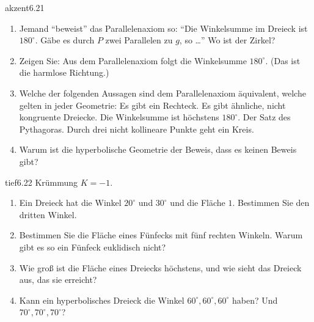 \begin{karte}{akzent}{6.21}{\typstolper}{}
\begin{enumerate}[label=(\alph*),leftmargin=1.6em,itemsep=2pt]
\item Jemand \enquote{beweist} das Parallelenaxiom so: \enquote{Die Winkelsumme im Dreieck ist $180^{\circ}$. Gäbe es durch $P$ zwei Parallelen zu $g$, so \dots} Wo ist der Zirkel?
\item Zeigen Sie: Aus dem Parallelenaxiom folgt die Winkelsumme $180^{\circ}$. (Das ist die harmlose Richtung.)
\item Welche der folgenden Aussagen sind dem Parallelenaxiom äquivalent, welche gelten in jeder Geometrie: Es gibt ein Rechteck. Es gibt ähnliche, nicht kongruente Dreiecke. Die Winkelsumme ist höchstens $180^{\circ}$. Der Satz des Pythagoras. Durch drei nicht kollineare Punkte geht ein Kreis.
\item Warum ist die hyperbolische Geometrie der Beweis, dass es keinen Beweis gibt?
\end{enumerate}
\end{karte}

\begin{karte}{tief}{6.22}{\typtypisch}{}
Krümmung $K = -1$.
\begin{enumerate}[label=(\alph*),leftmargin=1.6em,itemsep=2pt]
\item Ein Dreieck hat die Winkel $20^{\circ}$ und $30^{\circ}$ und die Fläche $1$. Bestimmen Sie den dritten Winkel.
\item Bestimmen Sie die Fläche eines Fünfecks mit fünf rechten Winkeln. Warum gibt es so ein Fünfeck euklidisch nicht?
\item Wie groß ist die Fläche eines Dreiecks höchstens, und wie sieht das Dreieck aus, das sie erreicht?
\item Kann ein hyperbolisches Dreieck die Winkel $60^{\circ}, 60^{\circ}, 60^{\circ}$ haben? Und $70^{\circ}, 70^{\circ}, 70^{\circ}$?
\end{enumerate}
\end{karte}

